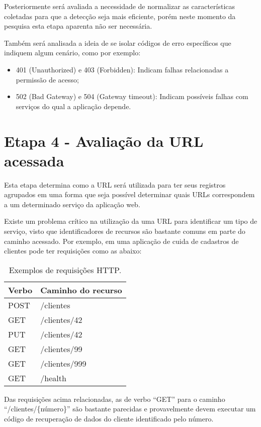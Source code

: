 Posteriormente será avaliada a necessidade de normalizar as características
coletadas para que a detecção seja mais eficiente, porém neste momento da
pesquisa esta etapa aparenta não ser necessária.

Também será analisada a ideia de se isolar códigos de erro específicos que
indiquem algum cenário, como por exemplo:

\begin{itemize}
  \item 401 (Unauthorized) e 403 (Forbidden): Indicam falhas relacionadas a permissão de acesso;
  \item 502 (Bad Gateway) e 504 (Gateway timeout): Indicam possíveis falhas com serviços do qual a aplicação depende.
\end{itemize}

\section{Etapa 4 - Avaliação da URL acessada}
\label{sec:etapa-4}

Esta etapa determina como a URL será utilizada para ter seus registros agrupados
em uma forma que seja possível determinar quais URLs correspondem a um determinado
serviço da aplicação web.

Existe um problema crítico na utilização da uma URL para identificar um tipo de
serviço, visto que identificadores de recursos são bastante comuns em parte do
caminho acessado. Por exemplo, em uma aplicação de cuida de cadastros de clientes
pode ter requisições como as abaixo:

\begin{table}[H]
\centering
\caption{Exemplos de requisições HTTP.}
\vspace{0.25cm}
\begin{tabular}{ll}
Verbo & Caminho do recurso \\
\hline
POST & /clientes           \\
GET  & /clientes/42        \\
PUT  & /clientes/42        \\
GET  & /clientes/99        \\
GET  & /clientes/999       \\
GET  & /health
\end{tabular}
\end{table}

Das requisições acima relacionadas, as de verbo ``GET'' para o caminho
``/clientes/\{número\}'' são bastante parecidas e provavelmente devem executar um
código de recuperação de dados do cliente identificado pelo número.

